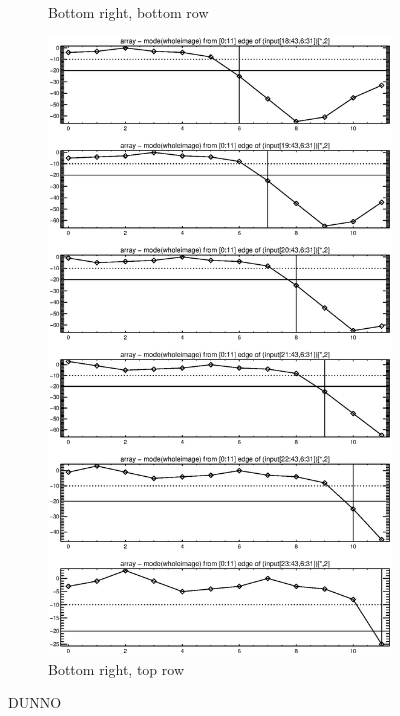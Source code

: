 \documentclass[10pt]{article}
\begin{document}
\begin{figure}[!h]
\begin{subfigure}[b]{.4\linewidth}
        \caption{Bottom right, bottom row}
    \end{subfigure}
    \hspace{1.0in}
    \begin{subfigure}[b]{.4\linewidth}
        \centering
        \includegraphics[width=1.4\textwidth]{../plots_tables_images/botright1.eps} 
        \caption{Bottom right, top row}
    \end{subfigure}
    \caption{DUNNO}
\end{figure}
\end{document}
